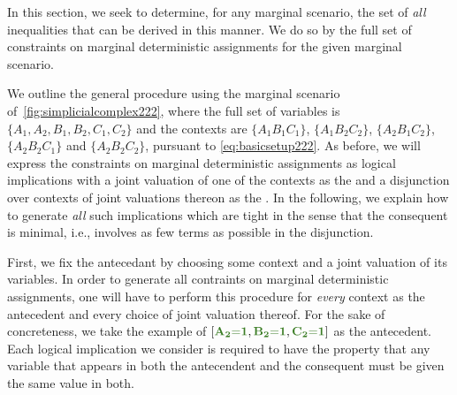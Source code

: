 {In this section, we seek to determine, for any marginal scenario, the set of \emph{all} inequalities that can be derived in this manner.  We do so by  the full set of constraints on marginal deterministic assignments for the given marginal scenario.

We outline the general procedure using 
the marginal scenario of~\cref{fig:simplicialcomplex222}, where the full set of variables is $\{ A_1, A_2, B_1, B_2, C_1, C_2\}$ and the contexts are $\{A_1 B_1 C_1\}$, $\{A_1 B_2 C_2\}$, $\{A_2 B_1 C_2\}$, $\{A_2 B_2 C_1\}$ and $\{A_2 B_2 C_2\}$, pursuant to \cref{eq:basicsetup222}.
As before, we will express the constraints on marginal deterministic assignments as logical implications with
a joint valuation of one of the contexts as the  and a disjunction over contexts of joint valuations thereon as the . In the following, we explain how to generate \emph{all} such implications which are tight in the sense that the consequent is minimal, i.e., involves as few terms as possible in the disjunction. 

First, we fix the antecedant by choosing some context and a joint valuation of its variables. In order to generate all contraints on marginal deterministic assignments, one will have to perform this procedure for \emph{every} context as the antecedent and every choice of joint valuation thereof. For the sake of concreteness, we take the example of $\bracks{\mgreen{A_2 \eql 1}, \mgreen{B_2 \eql 1}, \mgreen{C_2 \eql 1}}$ as the antecedent.  
Each logical implication we consider is required to have the property 
 that any variable that appears in both the antecendent and the consequent must be given the same value in both. 

}
